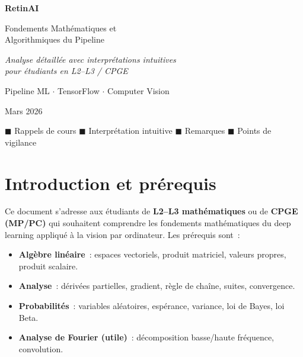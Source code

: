 \documentclass[11pt,a4paper]{article}
\begin{document}
\begin{titlepage}
\centering
\vspace*{2.5cm}
{\Huge\bfseries\color{accent} RetinAI\par}
\vspace{0.8cm}
{\LARGE Fondements Math\'ematiques et\\Algorithmiques du Pipeline\par}
\vspace{1.2cm}
{\large\textit{Analyse d\'etaill\'ee avec interpr\'etations intuitives\\pour \'etudiants en L2--L3 / CPGE}\par}
\vspace{2.5cm}
{\large Pipeline ML $\cdot$ TensorFlow $\cdot$ Computer Vision\par}
\vspace{1cm}
{\normalsize Mars 2026\par}
\vfill
{\small
\textcolor{mypurple}{$\blacksquare$} Rappels de cours \quad
\textcolor{myblue}{$\blacksquare$} Interpr\'etation intuitive \quad
\textcolor{mygreen}{$\blacksquare$} Remarques \quad
\textcolor{myorange}{$\blacksquare$} Points de vigilance}
\end{titlepage}

\tableofcontents
\newpage

\section{Introduction et pr\'erequis}

Ce document s'adresse aux \'etudiants de \textbf{L2--L3 math\'ematiques} ou de \textbf{CPGE (MP/PC)} qui souhaitent comprendre les fondements math\'ematiques du deep learning appliqu\'e \`a la vision par ordinateur. Les pr\'erequis sont~:

\begin{itemize}[leftmargin=2em]
  \item \textbf{Alg\`ebre lin\'eaire}~: espaces vectoriels, produit matriciel, valeurs propres, produit scalaire.
  \item \textbf{Analyse}~: d\'eriv\'ees partielles, gradient, r\`egle de cha\^ine, suites, convergence.
  \item \textbf{Probabilit\'es}~: variables al\'eatoires, esp\'erance, variance, loi de Bayes, loi Beta.
  \item \textbf{Analyse de Fourier (utile)}~: d\'ecomposition basse/haute fr\'equence, convolution.
\end{itemize}
\end{document}
